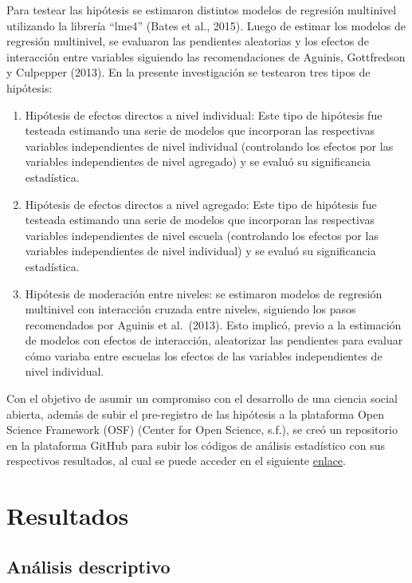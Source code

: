 \documentclass[12pt,twoside]{templates/facsothesis}
\begin{document}
Para testear las hipótesis se estimaron distintos modelos de regresión multinivel utilizando la librería ``lme4'' (Bates et al., 2015). Luego de estimar los modelos de regresión multinivel, se evaluaron las pendientes aleatorias y los efectos de interacción entre variables siguiendo las recomendaciones de Aguinis, Gottfredson y Culpepper (2013). En la presente investigación se testearon tres tipos de hipótesis:

\begin{enumerate}
\def\labelenumi{\arabic{enumi}.}
\item
  Hipótesis de efectos directos a nivel individual: Este tipo de hipótesis fue testeada estimando una serie de modelos que incorporan las respectivas variables independientes de nivel individual (controlando los efectos por las variables independientes de nivel agregado) y se evaluó su significancia estadística.
\item
  Hipótesis de efectos directos a nivel agregado: Este tipo de hipótesis fue testeada estimando una serie de modelos que incorporan las respectivas variables independientes de nivel escuela (controlando los efectos por las variables independientes de nivel individual) y se evaluó su significancia estadística.
\item
  Hipótesis de moderación entre niveles: se estimaron modelos de regresión multinivel con interacción cruzada entre niveles, siguiendo los pasos recomendados por Aguinis et al.~(2013). Esto implicó, previo a la estimación de modelos con efectos de interacción, aleatorizar las pendientes para evaluar cómo variaba entre escuelas los efectos de las variables independientes de nivel individual.
\end{enumerate}

Con el objetivo de asumir un compromiso con el desarrollo de una ciencia social abierta, además de subir el pre-registro de las hipótesis a la plataforma Open Science Framework (OSF) (Center for Open Science, s.f.), se creó un repositorio en la plataforma GitHub para subir los códigos de análisis estadístico con sus respectivos resultados, al cual se puede acceder en el siguiente \href{}{enlace}.

\hypertarget{resultados}{%
\chapter{Resultados}\label{resultados}}

\hypertarget{anuxe1lisis-descriptivo}{%
\section{Análisis descriptivo}\label{anuxe1lisis-descriptivo}}
\end{document}

